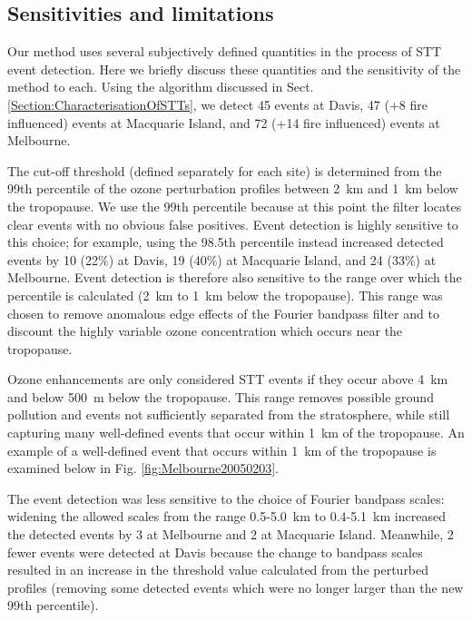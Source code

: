 \documentclass[acp, manuscript]{copernicus} %
\begin{document}
  \subsection{Sensitivities and limitations}
  \label{sec:sensitivity}
    Our method uses several subjectively defined quantities in the process of STT event detection.
    Here we briefly discuss these quantities and the sensitivity of the method to each.
    Using the algorithm discussed in Sect. \ref{Section:CharacterisationOfSTTs}, we detect 45 events at Davis, 47 (+8 fire influenced) events at Macquarie Island, and 72 (+14 fire influenced) events at Melbourne.

    The cut-off threshold (defined separately for each site) is determined from the 99th percentile of the ozone perturbation profiles between 2~km and 1~km below the tropopause.
    We use the 99th percentile because at this point the filter locates clear events with no obvious false positives.
    Event detection is highly sensitive to this choice; for example, using the 98.5th percentile instead increased detected events by 10 (22\%) at Davis, 19 (40\%) at Macquarie Island, and 24 (33\%) at Melbourne.
    Event detection is therefore also sensitive to the range over which the percentile is calculated (2~km to 1~km below the tropopause).
    This range was chosen to remove anomalous edge effects of the Fourier bandpass filter and to discount the highly variable ozone concentration which occurs near the tropopause.

    Ozone enhancements are only considered STT events if they occur above 4~km and below 500~m below the tropopause.
    This range removes possible ground pollution and events not sufficiently separated from the stratosphere, while still capturing many well-defined events that occur within 1~km of the tropopause.
    An example of a well-defined event that occurs within 1~km of the tropopause is examined below in Fig. \ref{fig:Melbourne20050203}.

    The event detection was less sensitive to the choice of Fourier bandpass scales: widening the allowed scales from the range 0.5-5.0~km to 0.4-5.1~km increased the detected events by 3 at Melbourne and 2 at Macquarie Island. Meanwhile, 2 fewer events were detected at Davis because the change to bandpass scales resulted in an increase in the threshold value calculated from the perturbed profiles (removing some detected events which were no longer larger than the new 99th percentile).
\end{document}
